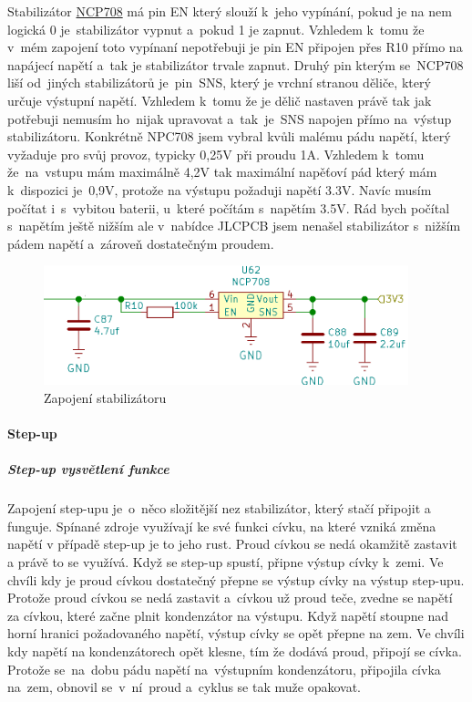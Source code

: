Stabilizátor \href{https://datasheet.lcsc.com/szlcsc/ON-Semicon-ON-NCP708MU330TAG_C183178.pdf}{NCP708} má pin EN který slouží k~jeho vypínání, 
pokud je na nem logická 0 je~stabilizátor vypnut a~pokud 1 je zapnut. Vzhledem k~tomu že v~mém zapojení toto vypínaní nepotřebuji je pin EN připojen 
přes R10 přímo na napájecí napětí a~tak je stabilizátor trvale zapnut. Druhý pin kterým se~NCP708 liší od~jiných stabilizátorů je~pin~SNS, 
který je vrchní stranou děliče, který určuje výstupní napětí. Vzhledem k~tomu že je dělič nastaven právě tak jak potřebuji nemusím ho~nijak 
upravovat a~tak~je~SNS napojen přímo na~výstup stabilizátoru. %
Konkrétně NPC708 jsem vybral kvůli malému pádu napětí, který vyžaduje pro svůj provoz, typicky 0,25V při proudu 1A. Vzhledem k~tomu že~na~vstupu 
mám maximálně 4,2V tak maximální napěťoví pád který mám k~dispozici je~0,9V, protože na výstupu požaduji napětí 3.3V. Navíc musím počítat 
i~s~vybitou baterii, u~které počítám s~napětím 3.5V. Rád bych počítal s~napětím ještě nižším ale v~nabídce JLCPCB jsem nenašel stabilizátor 
s~nižším pádem napětí a~zároveň dostatečným proudem. 

\begin{figure}[htbp]
    \centering
    \includegraphics[width=400]{kapitoly/obrazky/E4/napajeni/stabilizator.png}
    \caption{Zapojení stabilizátoru}
    \label{fig:E4-stabilizator}
\end{figure}

\paragraph*{Step-up}

\subparagraph*{Step-up vysvětlení funkce}
Zapojení step-upu je~o~něco složitější nez stabilizátor, který stačí připojit a funguje. Spínané zdroje využívají ke své funkci cívku, na které
vzniká změna napětí v případě step-up je to jeho rust. Proud cívkou se nedá okamžitě zastavit a právě to se využívá. 
Když se step-up spustí, připne výstup cívky k~zemi. Ve chvíli kdy je proud cívkou dostatečný přepne se výstup cívky na výstup step-upu.
Protože proud cívkou se nedá zastavit a~cívkou už proud teče, zvedne se napětí za cívkou, které začne plnit kondenzátor na výstupu.
Když napětí stoupne nad horní hranici požadovaného napětí, výstup cívky se opět přepne na zem. Ve chvíli kdy napětí na kondenzátorech opět 
klesne, tím že dodává proud, připojí se cívka. Protože se~na~dobu pádu napětí na~výstupním kondenzátoru, připojila cívka na~zem, obnovil 
se~v~ní~proud a~cyklus se tak muže opakovat.


